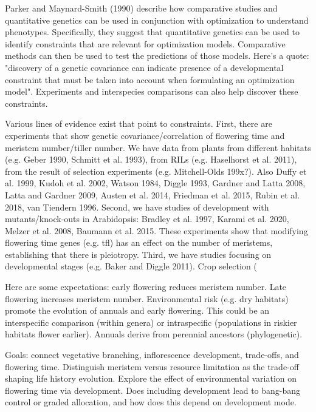 \documentclass[12pt, oneside]{article}   	%
\begin{document}
Parker and Maynard-Smith (1990) describe how comparative studies and quantitative genetics can be used in conjunction with optimization to understand phenotypes. Specifically, they suggest that quantitative genetics can be used to identify constraints that are relevant for optimization models. Comparative methods can then  be used to test the predictions of those models. Here's a quote: "discovery of a genetic covariance can indicate presence of a developmental constraint that must be taken into account when formulating an optimization model". Experiments and interspecies comparisons can also help discover these constraints. 

Various lines of evidence exist that point to constraints. First, there are experiments that show genetic covariance/correlation of flowering time and meristem number/tiller number. We have data from plants from different habitats (e.g. Geber 1990, Schmitt et al. 1993), from RILs (e.g. Haselhorst et al. 2011), from the result of selection experiments (e.g. Mitchell-Olds 199x?). Also Duffy et al. 1999, Kudoh et al. 2002, Watson 1984, Diggle 1993, Gardner and Latta 2008, Latta and Gardner 2009, Austen et al.  2014, Friedman et al. 2015, Rubin et al. 2018, van Tiendern 1996. Second, we have studies of development with mutants/knock-outs in Arabidopsis: Bradley et al. 1997, Karami et al. 2020, Melzer et al. 2008, Baumann et al. 2015. These experiments show that modifying flowering time genes (e.g. tfl) has an effect on the number of meristems, establishing that there is pleiotropy. Third, we have studies focusing on developmental stages (e.g. Baker and Diggle 2011). Crop selection (

Here are some expectations: early flowering reduces meristem number. Late flowering increases meristem number. Environmental risk (e.g. dry habitats) promote the evolution of annuals and early flowering. This could be an interspecific comparison (within genera) or intraspecific (populations in riskier habitats flower earlier). Annuals derive from perennial ancestors (phylogenetic).

Goals: connect vegetative branching, inflorescence development, trade-offs, and flowering time. Distinguish meristem versus resource limitation as the trade-off shaping life history evolution. Explore the effect of environmental variation on flowering time via development. Does including development lead to bang-bang control or graded allocation, and how does this depend on development mode.
\end{document}
